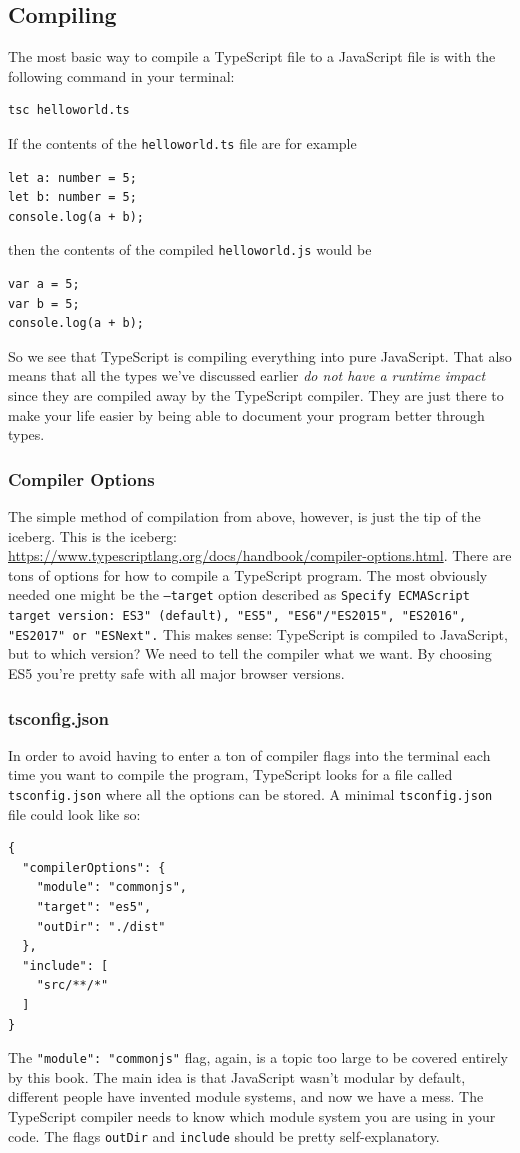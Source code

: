\documentclass[12pt,a4paper]{report}
\begin{document}
\subsection{Compiling}
The most basic way to compile a TypeScript file to a JavaScript file is with the following command in your terminal:
\begin{lstlisting}
tsc helloworld.ts
\end{lstlisting}
If the contents of the \texttt{helloworld.ts} file are for example
\begin{lstlisting}
let a: number = 5;
let b: number = 5;
console.log(a + b);
\end{lstlisting}
then the contents of the compiled \texttt{helloworld.js} would be
\begin{lstlisting}
var a = 5;
var b = 5;
console.log(a + b);
\end{lstlisting}
So we see that TypeScript is compiling everything into pure JavaScript. That also means that all the types we've discussed earlier \textit{do not have a runtime impact} since they are compiled away by the TypeScript compiler. They are just there to make your life easier by being able to document your program better through types.

\subsubsection{Compiler Options}
The simple method of compilation from above, however, is just the tip of the iceberg. This is the iceberg: \url{https://www.typescriptlang.org/docs/handbook/compiler-options.html}. There are tons of options for how to compile a TypeScript program. The most obviously needed one might be the \texttt{--target} option described as \texttt{Specify ECMAScript target version: ES3" (default), "ES5", "ES6"/"ES2015", "ES2016", "ES2017" or "ESNext".} This makes sense: TypeScript is compiled to JavaScript, but to which version? We need to tell the compiler what we want. By choosing ES5 you're pretty safe with all major browser versions.

\subsubsection{tsconfig.json}
In order to avoid having to enter a ton of compiler flags into the terminal each time you want to compile the program, TypeScript looks for a file called \texttt{tsconfig.json} where all the options can be stored. A minimal \texttt{tsconfig.json} file could look like so:
\begin{lstlisting}
{
  "compilerOptions": {
    "module": "commonjs",
    "target": "es5",
    "outDir": "./dist"
  },
  "include": [
    "src/**/*"
  ]
}
\end{lstlisting}
The \texttt{"module": "commonjs"} flag, again, is a topic too large to be covered entirely by this book. The main idea is that JavaScript wasn't modular by default, different people have invented module systems, and now we have a mess. The TypeScript compiler needs to know which module system you are using in your code. The flags \texttt{outDir} and \texttt{include} should be pretty self-explanatory.
\end{document}
